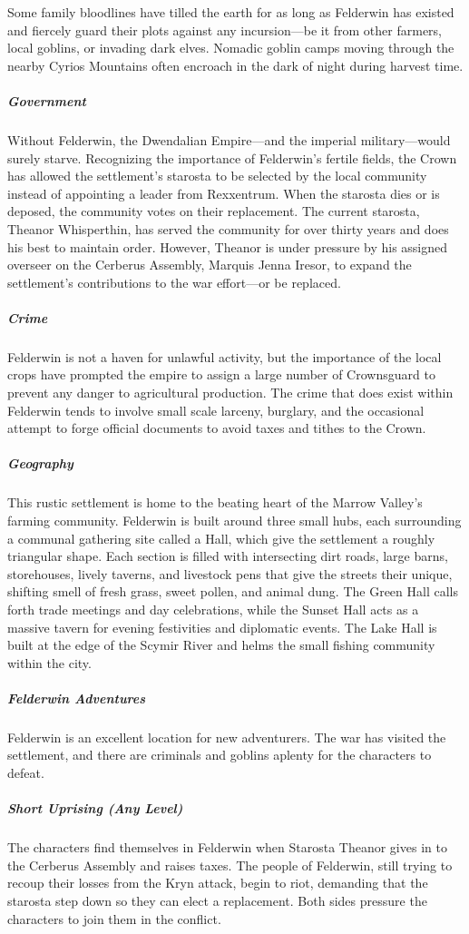 \documentclass[10pt,a4paper,twoside,bg=print,twocolumn,openany,nodeprecatedcode]{dndbook}
\begin{document}
Some family bloodlines have tilled the earth for as long as Felderwin has existed and fiercely guard their plots against any incursion—be it from other farmers, local goblins, or invading dark elves. Nomadic goblin camps moving through the nearby Cyrios Mountains often encroach in the dark of night during harvest time.

\subparagraph{Government}
Without Felderwin, the Dwendalian Empire—and the imperial military—would surely starve. Recognizing the importance of Felderwin's fertile fields, the Crown has allowed the settlement's starosta to be selected by the local community instead of appointing a leader from Rexxentrum. When the starosta dies or is deposed, the community votes on their replacement. The current starosta, Theanor Whisperthin, has served the community for over thirty years and does his best to maintain order. However, Theanor is under pressure by his assigned overseer on the Cerberus Assembly, Marquis Jenna Iresor, to expand the settlement's contributions to the war effort—or be replaced.

\subparagraph{Crime}
Felderwin is not a haven for unlawful activity, but the importance of the local crops have prompted the empire to assign a large number of Crownsguard to prevent any danger to agricultural production. The crime that does exist within Felderwin tends to involve small scale larceny, burglary, and the occasional attempt to forge official documents to avoid taxes and tithes to the Crown.

\subparagraph{Geography}
This rustic settlement is home to the beating heart of the Marrow Valley's farming community. Felderwin is built around three small hubs, each surrounding a communal gathering site called a Hall, which give the settlement a roughly triangular shape. Each section is filled with intersecting dirt roads, large barns, storehouses, lively taverns, and livestock pens that give the streets their unique, shifting smell of fresh grass, sweet pollen, and animal dung. The Green Hall calls forth trade meetings and day celebrations, while the Sunset Hall acts as a massive tavern for evening festivities and diplomatic events. The Lake Hall is built at the edge of the Scymir River and helms the small fishing community within the city.

\subparagraph{Felderwin Adventures}
Felderwin is an excellent location for new adventurers. The war has visited the settlement, and there are criminals and goblins aplenty for the characters to defeat.

\subparagraph{Short Uprising (Any Level)}
The characters find themselves in Felderwin when Starosta Theanor gives in to the Cerberus Assembly and raises taxes. The people of Felderwin, still trying to recoup their losses from the Kryn attack, begin to riot, demanding that the starosta step down so they can elect a replacement. Both sides pressure the characters to join them in the conflict.
\end{document}
